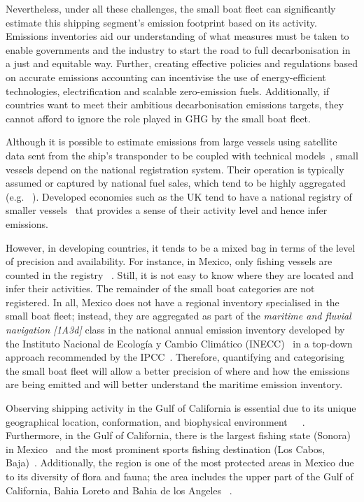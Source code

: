 Nevertheless, under all these challenges, the small boat fleet can significantly estimate this shipping segment's emission footprint based on its activity. Emissions inventories aid our understanding of what measures must be taken to enable governments and the industry to start the road to full decarbonisation in a just and equitable way. Further, creating effective policies and regulations based on accurate emissions accounting can incentivise the use of energy-efficient technologies, electrification and scalable zero-emission fuels. Additionally, if countries want to meet their ambitious decarbonisation emissions targets, they cannot afford to ignore the role played in GHG by the small boat fleet.

Although it is possible to estimate emissions from large vessels using satellite data sent from the ship's transponder to be coupled with technical models~\cite{IMO2021Fourth}, small vessels depend on the national registration system. Their operation is typically assumed or captured by national fuel sales, which tend to be highly aggregated (e.g. ~\cite{sener2018balance}). Developed economies such as the UK tend to have a national registry of smaller vessels~\cite{uk2021registration} that provides a sense of their activity level and hence infer  emissions.

However, in developing countries, it tends to be a mixed bag in terms of the level of precision and availability. For instance, in Mexico, only fishing vessels are counted in the registry ~\cite{Mexico2021RegisteredVessels}. Still, it is not easy to know where they are located and infer their activities. The remainder of the small boat categories are not registered. In all, Mexico does not have a regional  inventory specialised in the small boat fleet; instead, they are aggregated as part of the \textit{maritime and fluvial navigation [1A3d]} class in the national annual emission inventory developed by the Instituto Nacional de Ecología y Cambio Climático (INECC)~\cite{inecc2020inventario} in a top-down approach recommended by the IPCC~\cite{eggleston20062006}. Therefore, quantifying and categorising the small boat fleet will allow a better precision of where and how the emissions are being emitted and will better understand the maritime emission inventory.

Observing shipping activity in the Gulf of California is essential due to its unique geographical location, conformation, and biophysical environment~\cite{LLUCHCOTA20071}~\cite{munguia2018ecological}~\cite{MARINONE2012133}. Furthermore, in the Gulf of California, there is the largest fishing state (Sonora) in Mexico~\cite{MELTZER2006222} and the most prominent sports fishing destination (Los Cabos, Baja)~\cite{hernandez2012economic}. Additionally, the region is one of the most protected areas in Mexico due to its diversity of flora and fauna; the area includes the upper part of the Gulf of California, Bahia Loreto and Bahia de los Angeles ~\cite{CNANP2022Atlas, SMARN2022Islas}. 



